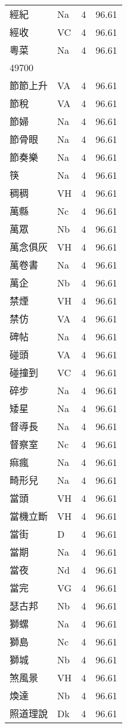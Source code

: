 \documentclass[twocolumn]{book}
\begin{document}
\begin{supertabular}{llrr}
經紀 & Na & 4 &  96.61\\
經收 & VC & 4 &  96.61\\
粵菜 & Na & 4 &  96.61\\
49700\\
節節上升 & VA & 4 &  96.61\\
節稅 & VA & 4 &  96.61\\
節婦 & Na & 4 &  96.61\\
節骨眼 & Na & 4 &  96.61\\
節奏樂 & Na & 4 &  96.61\\
筷 & Na & 4 &  96.61\\
稠稠 & VH & 4 &  96.61\\
萬縣 & Nc & 4 &  96.61\\
萬眾 & Nb & 4 &  96.61\\
萬念俱灰 & VH & 4 &  96.61\\
萬卷書 & Na & 4 &  96.61\\
萬企 & Nb & 4 &  96.61\\
禁煙 & VH & 4 &  96.61\\
禁仿 & VA & 4 &  96.61\\
碑帖 & Na & 4 &  96.61\\
碰頭 & VA & 4 &  96.61\\
碰撞到 & VC & 4 &  96.61\\
碎步 & Na & 4 &  96.61\\
矮星 & Na & 4 &  96.61\\
督導長 & Na & 4 &  96.61\\
督察室 & Nc & 4 &  96.61\\
痲瘋 & Na & 4 &  96.61\\
畸形兒 & Na & 4 &  96.61\\
當頭 & VH & 4 &  96.61\\
當機立斷 & VH & 4 &  96.61\\
當街 & D & 4 &  96.61\\
當期 & Na & 4 &  96.61\\
當夜 & Nd & 4 &  96.61\\
當完 & VG & 4 &  96.61\\
瑟古邦 & Nb & 4 &  96.61\\
獅螺 & Na & 4 &  96.61\\
獅島 & Nc & 4 &  96.61\\
獅城 & Nb & 4 &  96.61\\
煞風景 & VH & 4 &  96.61\\
煥達 & Nb & 4 &  96.61\\
照道理說 & Dk & 4 &  96.61\\

\end{supertabular}
\end{document}
